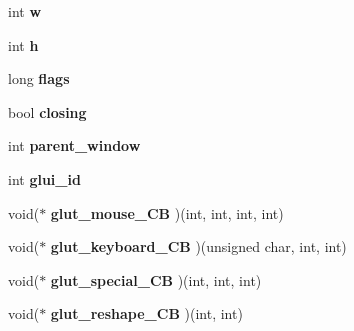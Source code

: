 \begin{DoxyCompactItemize}
\item 
\hypertarget{classGLUI__Main_acee19f928a4837310f654431fda7cc1a}{int {\bfseries w}}\label{classGLUI__Main_acee19f928a4837310f654431fda7cc1a}

\item 
\hypertarget{classGLUI__Main_a7c5cd9db296247eceb52c2aa84448e0f}{int {\bfseries h}}\label{classGLUI__Main_a7c5cd9db296247eceb52c2aa84448e0f}

\item 
\hypertarget{classGLUI__Main_ac3fbf169a16afe8e09cebf714f4aee65}{long {\bfseries flags}}\label{classGLUI__Main_ac3fbf169a16afe8e09cebf714f4aee65}

\item 
\hypertarget{classGLUI__Main_a5392e305249f1baf91402460b7c14f10}{bool {\bfseries closing}}\label{classGLUI__Main_a5392e305249f1baf91402460b7c14f10}

\item 
\hypertarget{classGLUI__Main_a70e6e1ec266281f272954fcc42f85087}{int {\bfseries parent\-\_\-window}}\label{classGLUI__Main_a70e6e1ec266281f272954fcc42f85087}

\item 
\hypertarget{classGLUI__Main_a6f8d24f29be85514e1abe05f4f33eb17}{int {\bfseries glui\-\_\-id}}\label{classGLUI__Main_a6f8d24f29be85514e1abe05f4f33eb17}

\item 
\hypertarget{classGLUI__Main_a8a4d3dfa4aac5817297071f05d808afb}{void($\ast$ {\bfseries glut\-\_\-mouse\-\_\-\-C\-B} )(int, int, int, int)}\label{classGLUI__Main_a8a4d3dfa4aac5817297071f05d808afb}

\item 
\hypertarget{classGLUI__Main_a96d36ca6359fb96bca292a9ff7b1d53f}{void($\ast$ {\bfseries glut\-\_\-keyboard\-\_\-\-C\-B} )(unsigned char, int, int)}\label{classGLUI__Main_a96d36ca6359fb96bca292a9ff7b1d53f}

\item 
\hypertarget{classGLUI__Main_aa50303a909f39a7b28cfdf076cc848a4}{void($\ast$ {\bfseries glut\-\_\-special\-\_\-\-C\-B} )(int, int, int)}\label{classGLUI__Main_aa50303a909f39a7b28cfdf076cc848a4}

\item 
\hypertarget{classGLUI__Main_a93bdf0d34e2f3494dce800ba16da4ec2}{void($\ast$ {\bfseries glut\-\_\-reshape\-\_\-\-C\-B} )(int, int)}\label{classGLUI__Main_a93bdf0d34e2f3494dce800ba16da4ec2}

\end{DoxyCompactItemize}
